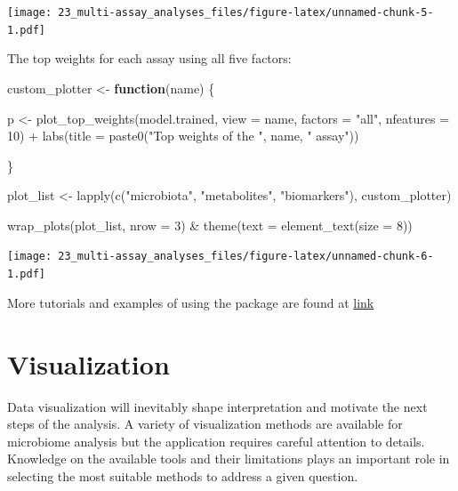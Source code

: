 \documentclass[
]{book}
\newenvironment{Shaded}{\begin{snugshade}}{\end{snugshade}}
\newcommand{\AttributeTok}[1]{\textcolor[rgb]{0.77,0.63,0.00}{#1}}
\newcommand{\ControlFlowTok}[1]{\textcolor[rgb]{0.13,0.29,0.53}{\textbf{#1}}}
\newcommand{\DecValTok}[1]{\textcolor[rgb]{0.00,0.00,0.81}{#1}}
\newcommand{\FunctionTok}[1]{\textcolor[rgb]{0.00,0.00,0.00}{#1}}
\newcommand{\NormalTok}[1]{#1}
\newcommand{\OtherTok}[1]{\textcolor[rgb]{0.56,0.35,0.01}{#1}}
\newcommand{\SpecialCharTok}[1]{\textcolor[rgb]{0.00,0.00,0.00}{#1}}
\newcommand{\StringTok}[1]{\textcolor[rgb]{0.31,0.60,0.02}{#1}}
\begin{document}
\texttt{[image: 23\_multi-assay\_analyses\_files/figure-latex/unnamed-chunk-5-1.pdf]}

The top weights for each assay using all five factors:

\begin{Shaded}
\begin{Highlighting}[]
\NormalTok{custom\_plotter }\OtherTok{\textless{}{-}} \ControlFlowTok{function}\NormalTok{(name) \{}
  
\NormalTok{  p }\OtherTok{\textless{}{-}} \FunctionTok{plot\_top\_weights}\NormalTok{(model.trained,}
                        \AttributeTok{view =}\NormalTok{ name,}
                        \AttributeTok{factors =} \StringTok{"all"}\NormalTok{,}
                        \AttributeTok{nfeatures =} \DecValTok{10}\NormalTok{) }\SpecialCharTok{+}
    \FunctionTok{labs}\NormalTok{(}\AttributeTok{title =} \FunctionTok{paste0}\NormalTok{(}\StringTok{"Top weights of the "}\NormalTok{, name, }\StringTok{" assay"}\NormalTok{))}
  
\NormalTok{\}}

\NormalTok{plot\_list }\OtherTok{\textless{}{-}} \FunctionTok{lapply}\NormalTok{(}\FunctionTok{c}\NormalTok{(}\StringTok{"microbiota"}\NormalTok{, }\StringTok{"metabolites"}\NormalTok{, }\StringTok{"biomarkers"}\NormalTok{), custom\_plotter)}

\FunctionTok{wrap\_plots}\NormalTok{(plot\_list, }\AttributeTok{nrow =} \DecValTok{3}\NormalTok{) }\SpecialCharTok{\&} \FunctionTok{theme}\NormalTok{(}\AttributeTok{text =} \FunctionTok{element\_text}\NormalTok{(}\AttributeTok{size =} \DecValTok{8}\NormalTok{))}
\end{Highlighting}
\end{Shaded}

\texttt{[image: 23\_multi-assay\_analyses\_files/figure-latex/unnamed-chunk-6-1.pdf]}

More tutorials and examples of using the package are found at \href{https://biofam.github.io/MOFA2/tutorials.html}{link}

\hypertarget{viz-chapter}{%
\chapter{Visualization}\label{viz-chapter}}

Data visualization will inevitably shape interpretation and motivate
the next steps of the analysis. A variety of visualization methods are
available for microbiome analysis but the application requires careful
attention to details. Knowledge on the available tools and their
limitations plays an important role in selecting the most suitable
methods to address a given question.
\end{document}
